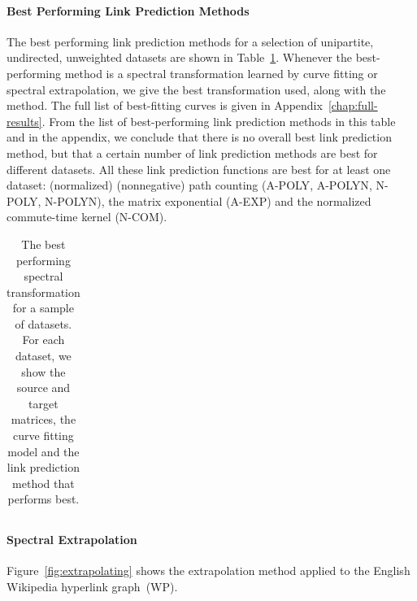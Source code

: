 \documentclass[11pt,a4paper]{book}
\begin{document}
\paragraph{Best Performing Link Prediction Methods}
The best performing link prediction methods for a selection of
unipartite, undirected, unweighted datasets are shown in 
Table~\ref{tab:bestcurve-base}.  
Whenever the best-performing method is a spectral transformation
learned by curve fitting or spectral extrapolation, we give the best
transformation used, along with the method. 
The full list of best-fitting curves is
given in Appendix~\ref{chap:full-results}.  
From the list of best-performing link prediction methods in this table
and in the appendix, we conclude that there is no overall best link
prediction method, but that
a certain number of link
prediction methods are best for different datasets.  All these link
prediction functions are best for at least one dataset:  (normalized)
(nonnegative) path counting 
(\mbox{\textrm{A-POLY}}, \mbox{\textrm{A-POLYN}}, \textrm{N-POLY}, \textrm{N-POLYN}),
the matrix exponential (\textrm{A-EXP}) and the normalized commute-time
kernel (\textrm{N-COM}). 

\begin{table}[h!]
  \centering
  \caption{
    The best performing spectral transformation for a sample of datasets. 
    For each dataset, we show the source and target matrices, the curve
    fitting model and the link prediction method that performs best. 
  }
  \begin{tabular}{ lllll }
    \toprule
    
    \midrule
    
    \bottomrule
  \end{tabular}			
  \label{tab:bestcurve-base}
\end{table}

\paragraph{Spectral Extrapolation}
Figure~\ref{fig:extrapolating} shows the extrapolation method applied to
the English Wikipedia hyperlink graph~(\textsf{WP}).
\end{document}
